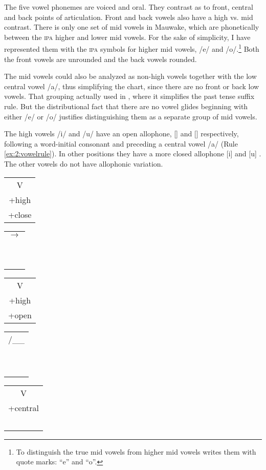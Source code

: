 The five vowel phonemes are voiced and oral. They contrast as to front, central and back points of articulation. Front and back vowels also have a high vs. mid contrast. There is only one set of mid vowels in Mauwake, which are phonetically between the \textsc{ipa} higher and lower mid vowels.  For the sake of simplicity, I have represented them with the \textsc{ipa} symbols for higher mid vowels, /e/ and /o/.\footnote{To distinguish the true mid vowels from higher mid vowels \citet[123]{Maddieson1984} writes them with quote marks: ``e'' and ``o''.}  Both the front vowels are unrounded and the back vowels rounded.

The mid vowels could also be analyzed as non-high vowels together with the low central vowel /a/, thus simplifying the chart, since there are no front or back low vowels. That grouping  actually used in , where it simplifies the past tense suffix rule. But the distributional fact that there are no vowel glides beginning with either /e/ or /o/ justifies distinguishing them as a separate group of mid vowels.  

The high vowels /i/ and /u/ have an open allophone, [{\textsci}] and [{\textupsilon}] respectively, following a word-initial consonant and preceding a central vowel /a/ (Rule \ref{ex:2:vowelrule}). In other positions they have a more closed allophone [i] and [u] . The other vowels do not have allophonic variation.

\ea
\label{ex:2:vowelrule}
\begin{tabular}{c}V\\+high\\+close\end{tabular}
\begin{tabular}{c}$\to$\\~\\~\end{tabular}
\begin{tabular}{c}V\\+high\\+open\end{tabular}
\begin{tabular}{c}/\_\_\\~\\~\end{tabular}
\begin{tabular}{c}V\\+central\\~\end{tabular}
\z

